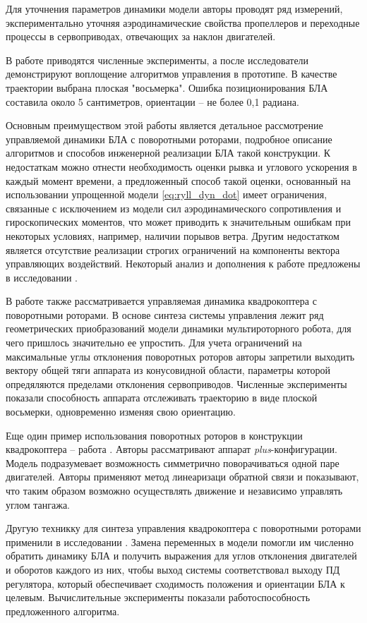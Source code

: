 Для уточнения параметров динамики модели авторы проводят ряд измерений, экспериментально уточняя аэродинамические свойства пропеллеров и переходные процессы в сервоприводах, отвечающих за наклон двигателей.

В работе приводятся численные эксперименты, а после исследователи демонстрируют воплощение алгоритмов управления в прототипе.
В качестве траектории выбрана плоская "восьмерка".
Ошибка позиционирования БЛА составила около 5 сантиметров, ориентации -- не более 0,1 радиана.

Основным преимуществом этой работы является детальное рассмотрение управляемой динамики БЛА с поворотными роторами, подробное описание алгоритмов и способов инженерной реализации БЛА такой конструкции.
К недостаткам можно отнести необходимость оценки рывка и углового ускорения в каждый момент времени, а предложенный способ такой оценки, основанный на использовании упрощенной модели \eqref{eq:ryll_dyn_dot} имеет ограничения, связанные с исключением из модели сил аэродинамического сопротивления и гироскопических моментов, что может приводить к значительным ошибкам при некоторых условиях, например, наличии порывов ветра. Другим недостатком является отсутствие реализации строгих ограничений на компоненты вектора управляющих воздействий. Некоторый анализ и дополнения к работе \cite{Ryll01} предложены в исследовании \cite{Stolc01}.

В работе  \cite{Invernizzi01} также рассматривается управляемая динамика квадрокоптера с поворотными роторами. В основе синтеза системы управления лежит ряд геометрических приобразований модели динамики мультироторного робота, для чего пришлось значительно ее упростить.
Для учета ограничений на максимальные углы отклонения поворотных роторов авторы запретили выходить вектору общей тяги аппарата из конусовидной области, параметры которой опредяляются пределами отклонения сервоприводов.
Численные эксперименты показали способность аппарата отслеживать траекторию в виде плоской восьмерки, одновременно изменяя свою ориентацию.

Еще один пример использования поворотных роторов в конструкции квадрокоптера -- работа \cite{Nemati01}.
Авторы рассматривают аппарат \textit{plus}-конфигурации.
Модель подразумевает возможность симметрично поворачиваться одной паре двигателей.
Авторы применяют метод линеаризаци обратной связи и показывают, что таким образом возможно осуществлять движение и независимо управлять углом тангажа.

Другую техникку для синтеза управления квадрокоптера с поворотными роторами применили в исследовании \cite{Falconi01}.
Замена переменных в модели помогли им численно обратить динамику БЛА и получить выражения для углов отклонения двигателей и оборотов каждого из них, чтобы выход системы соответствовал выходу ПД регулятора, который обеспечивает сходимость положения и ориентации БЛА к целевым.
Вычислительные эксперименты показали работоспособность предложенного алгоритма.

